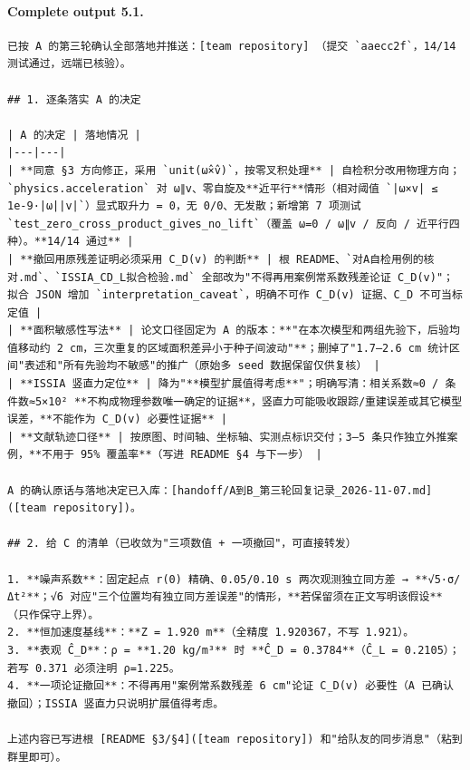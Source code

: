 \documentclass[UTF8,10pt]{ctexart}
\begin{document}
\paragraph{Complete output 5.1.}
\begin{Verbatim}[breaklines=true,breakanywhere=true,fontsize=\scriptsize,frame=single,framesep=2pt]
已按 A 的第三轮确认全部落地并推送：[team repository] （提交 `aaecc2f`，14/14 测试通过，远端已核验）。

## 1. 逐条落实 A 的决定

| A 的决定 | 落地情况 |
|---|---|
| **同意 §3 方向修正，采用 `unit(ω̂×v̂)`，按零叉积处理** | 自检积分改用物理方向；`physics.acceleration` 对 ω∥v、零自旋及**近平行**情形（相对阈值 `|ω×v| ≤ 1e-9·|ω||v|`）显式取升力 = 0，无 0/0、无发散；新增第 7 项测试 `test_zero_cross_product_gives_no_lift`（覆盖 ω=0 / ω∥v / 反向 / 近平行四种）。**14/14 通过** |
| **撤回用原残差证明必须采用 C_D(v) 的判断** | 根 README、`对A自检用例的核对.md`、`ISSIA_CD_L拟合检验.md` 全部改为"不得再用案例常系数残差论证 C_D(v)"；拟合 JSON 增加 `interpretation_caveat`，明确不可作 C_D(v) 证据、C_D 不可当标定值 |
| **面积敏感性写法** | 论文口径固定为 A 的版本：**"在本次模型和两组先验下，后验均值移动约 2 cm，三次重复的区域面积差异小于种子间波动"**；删掉了"1.7–2.6 cm 统计区间"表述和"所有先验均不敏感"的推广（原始多 seed 数据保留仅供复核） |
| **ISSIA 竖直力定位** | 降为"**模型扩展值得考虑**"；明确写清：相关系数≈0 / 条件数≈5×10² **不构成物理参数唯一确定的证据**，竖直力可能吸收跟踪/重建误差或其它模型误差，**不能作为 C_D(v) 必要性证据** |
| **文献轨迹口径** | 按原图、时间轴、坐标轴、实测点标识交付；3–5 条只作独立外推案例，**不用于 95% 覆盖率**（写进 README §4 与下一步） |

A 的确认原话与落地决定已入库：[handoff/A到B_第三轮回复记录_2026-11-07.md]([team repository])。

## 2. 给 C 的清单（已收敛为"三项数值 + 一项撤回"，可直接转发）

1. **噪声系数**：固定起点 r(0) 精确、0.05/0.10 s 两次观测独立同方差 → **√5·σ/Δt²**；√6 对应"三个位置均有独立同方差误差"的情形，**若保留须在正文写明该假设**（只作保守上界）。
2. **恒加速度基线**：**Z = 1.920 m**（全精度 1.920367，不写 1.921）。
3. **表观 Ĉ_D**：ρ = **1.20 kg/m³** 时 **Ĉ_D = 0.3784**（Ĉ_L = 0.2105）；若写 0.371 必须注明 ρ=1.225。
4. **一项论证撤回**：不得再用"案例常系数残差 6 cm"论证 C_D(v) 必要性（A 已确认撤回）；ISSIA 竖直力只说明扩展值得考虑。

上述内容已写进根 [README §3/§4]([team repository]) 和"给队友的同步消息"（粘到群里即可）。


\end{Verbatim}
\end{document}
